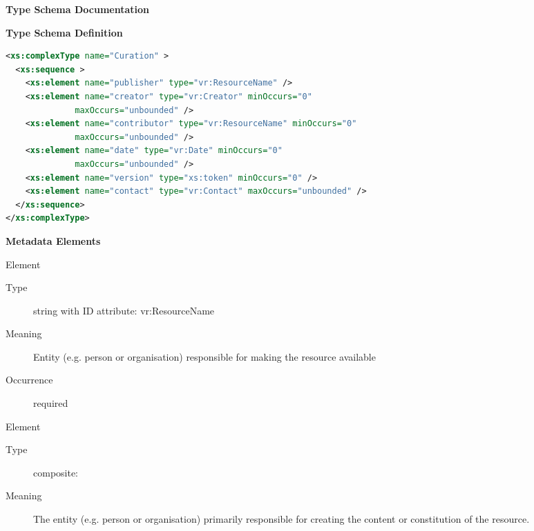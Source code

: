 \documentclass[11pt,a4paper]{ivoa}
\begin{document}
\begin{generated}
\begingroup
      	\renewcommand*\descriptionlabel[1]{%
      	\hbox to 5.5em{\emph{#1}\hfil}}\vspace{2ex}\noindent\textbf{ Type Schema Documentation}


\vspace{1ex}\noindent\textbf{ Type Schema Definition}

\begin{lstlisting}[language=XML,basicstyle=\footnotesize]
<xs:complexType name="Curation" >
  <xs:sequence >
    <xs:element name="publisher" type="vr:ResourceName" />
    <xs:element name="creator" type="vr:Creator" minOccurs="0"
              maxOccurs="unbounded" />
    <xs:element name="contributor" type="vr:ResourceName" minOccurs="0"
              maxOccurs="unbounded" />
    <xs:element name="date" type="vr:Date" minOccurs="0"
              maxOccurs="unbounded" />
    <xs:element name="version" type="xs:token" minOccurs="0" />
    <xs:element name="contact" type="vr:Contact" maxOccurs="unbounded" />
  </xs:sequence>
</xs:complexType>
\end{lstlisting}

\vspace{0.5ex}\noindent\textbf{ Metadata Elements}

\begingroup\small\begin{bigdescription}\item[Element \xmlel{publisher}]
\begin{description}
\item[Type] string with ID attribute: vr:ResourceName
\item[Meaning] 
               Entity (e.g. person or organisation) responsible for making the 
               resource available
             
\item[Occurrence] required

\end{description}
\item[Element \xmlel{creator}]
\begin{description}
\item[Type] composite: 
\item[Meaning] 
                The entity (e.g. person or organisation) primarily responsible 
                for creating the content or constitution of the resource.
             

\end{description}
\end{bigdescription}
\end{generated}
\end{document}
